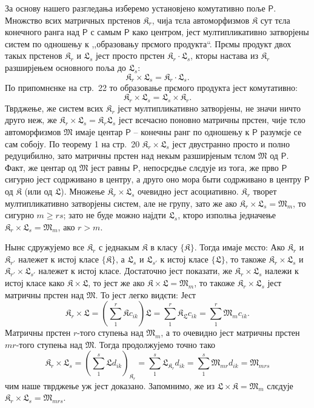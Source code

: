 \documentclass[11pt]{article}
\begin{document}
За основу нашего разгледања изберемо установјено комутативно поље \(\mathsf P\). Множство всих матричных прстенов \(\mathfrak K_r\), чија тєла автоморфизмов \(\mathfrak K\) сут тєла конечного ранга над \(\mathsf P\) с самым \(\mathsf P\) како центром, јест мултипликативно затворјены систем по одношењу к ,,образовању прємого продукта``. Прємы продукт двох такых прстенов \(\mathfrak K_r\) и \(\mathfrak L_s\) јест просто прстен \(\mathfrak K_r\cdot\mathfrak L_s\), кторы настава из \(\mathfrak K_r\) разширјењем основного поља до \(\mathfrak L_s\):
\[
\mathfrak K_r\times\mathfrak L_s=\mathfrak K_r\cdot\mathfrak L_s.
\]
По припомнєнке на стр.~22 то образовање прємого продукта јест комутативно:
\[
\mathfrak K_r\times\mathfrak L_s=\mathfrak L_s\times\mathfrak K_r.
\]
Тврджење, же систем всих \(\mathfrak K_r\) јест мултипликативно затворјены, не значи ничто друго неж, же \(\mathfrak K_r\times\mathfrak L_s=\mathfrak K_r\mathfrak L_s\) јест всечасно поновно матричны прстен, чије тєло автоморфизмов \(\mathfrak M\) имаје центар \(\mathsf P\) -- конечны ранг по одношењу к \(\mathsf P\) разумєје се сам собоју. По теорему 1 на стр.~20 \(\mathfrak K_r\times\mathfrak L_s\) јест двустранно просто и полно редуцибилно, зато матричны прстен над некым разширјеным тєлом \(\mathfrak M\) од \(\mathsf P\). Факт, же центар од \(\mathfrak M\) јест равны \(\mathsf P\), непосрєдње слєдује из тога, же прво \(\mathsf P\) сигурно јест содрживано в центру, а друго оно мора быти содрживано в центру \(\mathsf P\) од \(\mathfrak K\) (или од \(\mathfrak L\)). Множење \(\mathfrak K_r\times\mathfrak L_s\) очевидно јест асоциативно. \(\mathfrak K_r\) творет мултипликативно затворјены систем, але не групу, зато же ако \(\mathfrak K_r\times\mathfrak L_s=\mathfrak M_m\), то сигурно \(m\geq rs\); зато не буде можно најдти \(\mathfrak L_s\), кторо изполња једначење \(\mathfrak K_r\times\mathfrak L_s=\mathfrak M_m\), ако \(r>m\).

Нынє сдружујемо все \(\mathfrak K_r\) с једнакым \(\mathfrak K\) в класу \(\{\mathfrak K\}\). Тогда имаје мєсто: Ако \(\mathfrak K_r\) и \(\mathfrak K_{r'}\) належет к истој класе \(\{\mathfrak K\}\), а \(\mathfrak L_s\) и \(\mathfrak L_{s'}\) к истој класе \(\{\mathfrak L\}\), то такоже \(\mathfrak K_r\times\mathfrak L_s\) и \(\mathfrak K_{r'}\times\mathfrak L_{s'}\) належет к истој класе. Достаточно јест показати, же \(\mathfrak K_r\times\mathfrak L_s\) належи к истој класе како \(\mathfrak K\times\mathfrak L\), то јест же ако \(\mathfrak K\times\mathfrak L=\mathfrak M_m\), то такоже \(\mathfrak K_r\times\mathfrak L_s\) јест матричны прстен над \(\mathfrak M\). То јест легко видєти: Јест
\[
\mathfrak K_r\times\mathfrak L
=\left(\sum_1^r\mathfrak K c_{ik}\right)\mathfrak L
=\sum_1^r\mathfrak K_{\mathfrak L}c_{ik}
=\sum_1^r\mathfrak M_m c_{ik}.
\]
Матричны прстен \(r\)-того ступења над \(\mathfrak M_m\), а то очевидно јест матричны прстен \(mr\)-того ступења над \(\mathfrak M\). Тогда продолжујемо точно тако
\[
\mathfrak K_r\times\mathfrak L_s
=\left(\sum_1^s\mathfrak L d_{ik}\right)_{\mathfrak K_r}
=\sum_1^s\mathfrak L_{\mathfrak K_r}d_{ik}
=\sum_1^s\mathfrak M_{mr}d_{ik}
=\mathfrak M_{mrs}
\]
чим наше тврджење уж јест доказано. Запомнимо, же из \(\mathfrak L\times\mathfrak K=\mathfrak M_m\) слєдује \(\mathfrak K_r\times\mathfrak L_s=\mathfrak M_{mrs}\).
\end{document}
